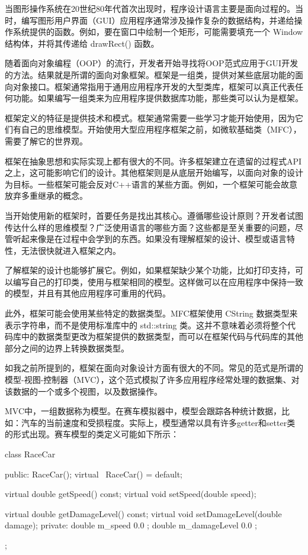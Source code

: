 
当图形操作系统在20世纪80年代首次出现时，程序设计语言主要是面向过程的。当时，编写图形用户界面（GUI）应用程序通常涉及操作复杂的数据结构，并递给操作系统提供的函数。例如，要在窗口中绘制一个矩形，可能需要填充一个 Window 结构体，并将其传递给 drawRect() 函数。

随着面向对象编程（OOP）的流行，开发者开始寻找将OOP范式应用于GUI开发的方法。结果就是所谓的面向对象框架。框架是一组类，提供对某些底层功能的面向对象接口。框架通常指用于通用应用程序开发的大型类库，框架可以真正代表任何功能。如果编写一组类来为应用程序提供数据库功能，那些类可以认为是框架。


框架定义的特征是提供技术和模式。框架通常需要一些学习才能开始使用，因为它们有自己的思维模型。开始使用大型应用程序框架之前，如微软基础类（MFC），需要了解它的世界观。

框架在抽象思想和实际实现上都有很大的不同。许多框架建立在遗留的过程式API之上，这可能影响它们的设计。其他框架则是从底层开始编写，以面向对象的设计为目标。一些框架可能会反对C++语言的某些方面。例如，一个框架可能会故意放弃多重继承的概念。

当开始使用新的框架时，首要任务是找出其核心。遵循哪些设计原则？开发者试图传达什么样的思维模型？广泛使用语言的哪些方面？这些都是至关重要的问题，尽管听起来像是在过程中会学到的东西。如果没有理解框架的设计、模型或语言特性，无法很快就进入框架之内。

了解框架的设计也能够扩展它。例如，如果框架缺少某个功能，比如打印支持，可以编写自己的打印类，使用与框架相同的模型。这样做可以在应用程序中保持一致的模型，并且有其他应用程序可重用的代码。

此外，框架可能会使用某些特定的数据类型。MFC框架使用 CString 数据类型来表示字符串，而不是使用标准库中的 std::string 类。这并不意味着必须将整个代码库中的数据类型更改为框架提供的数据类型，而可以在框架代码与代码库的其他部分之间的边界上转换数据类型。


如我之前所提到的，框架在面向对象设计方面有很大的不同。常见的范式是所谓的模型-视图-控制器（MVC），这个范式模拟了许多应用程序经常处理的数据集、对该数据的一个或多个视图，以及数据操作。

MVC中，一组数据称为模型。在赛车模拟器中，模型会跟踪各种统计数据，比如：汽车的当前速度和受损程度。实际上，模型通常以具有许多getter和setter类的形式出现。赛车模型的类定义可能如下所示：

\begin{cpp}
class RaceCar
{
    public:
        RaceCar();
        virtual ~RaceCar() = default;

        virtual double getSpeed() const;
        virtual void setSpeed(double speed);

        virtual double getDamageLevel() const;
        virtual void setDamageLevel(double damage);
    private:
        double m_speed { 0.0 };
        double m_damageLevel { 0.0 };
};
\end{cpp}

